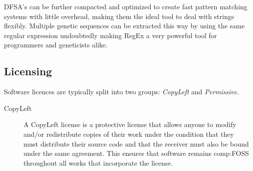 DFSA's can be further compacted and optimized to create fast pattern matching systems with little overhead, making them the ideal tool to deal with strings flexibly. Multiple genetic sequences can be extracted this way by using the same regular expression undoubtedly making RegEx a very powerful tool for programmers and geneticists alike.

\subsection{Licensing}\label{ref:app:licensing}

Software licences are typically split into two groups: \textit{CopyLeft} and \textit{Permissive}.

\begin{description}
\item[CopyLeft]{
A CopyLeft license is a protective license that allows anyone to modify and/or redistribute copies of their work under the condition that they must distribute their source code and that the receiver must also be bound under the same agreement. This ensures that software remains \gls{comp:FOSS} throughout all works that incorporate the license.

}
\end{description}
